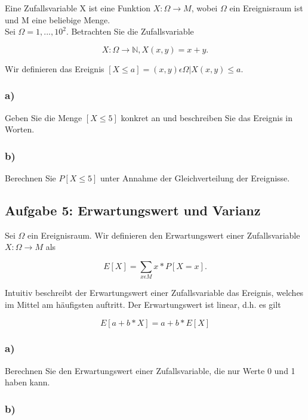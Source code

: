 \documentclass[paper=a4, fontsize=11pt]{scrartcl}
\numberwithin{equation}{section}
\numberwithin{figure}{section}
\numberwithin{table}{section}
\begin{document}
Eine Zufallsvariable X ist eine Funktion $X: \Omega \rightarrow M$, wobei $\Omega$ ein Ereignisraum ist und M eine beliebige Menge. \\

Sei $\Omega = {1, ..., 10}^{2}$. Betrachten Sie die Zufallsvariable

$$X: \Omega \rightarrow \mathbb{N}, X(x,y) = x+y.$$

Wir definieren das Ereignis $[X \leq a] = {(x,y) \epsilon \Omega | X(x,y) \leq a}.$

\subsubsection*{a)}

Geben Sie die Menge $[X \leq 5]$ konkret an und beschreiben Sie das Ereignis in Worten.

\subsubsection*{b)}

Berechnen Sie $P[X \leq 5]$ unter Annahme der Gleichverteilung der Ereignisse.


\subsection{Aufgabe 5: Erwartungswert und Varianz}

Sei $\Omega$ ein Ereignisraum. Wir definieren den Erwartungswert einer Zufallsvariable $X: \Omega \rightarrow M$ als

$$E[X] = \sum_{x \epsilon M} x * P[X=x].$$

Intuitiv beschreibt der Erwartungswert einer Zufallsvariable das Ereignis, welches im Mittel am häufigsten auftritt. Der Erwartungswert ist linear, d.h. es gilt

$$E[a+b*X] = a+b * E[X]$$

\subsubsection*{a)}

Berechnen Sie den Erwartungswert einer Zufallsvariable, die nur Werte 0 und 1 haben kann.

\subsubsection*{b)}
\end{document}
